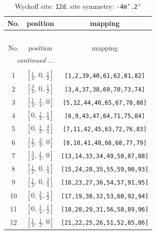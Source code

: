 \documentclass[fleqn,8pt]{jsarticle}
\begin{document}
\begin{longtable}{ccc}
\caption{Wyckoff site: {\tt 12d}, site symmetry: {\tt -4m'.2'}}
 \\
 \hline \hline
No. & position & mapping \\ \hline \endfirsthead

\multicolumn{2}{l}{\tablename\ \thetable{}} \\
 \hline \hline
No. & position & mapping \\ \hline \endhead

 \hline \hline
\multicolumn{2}{r}{\footnotesize\it continued ...} \\ \endfoot

 \hline \hline
\multicolumn{2}{r}{} \\ \endlastfoot

1 & $\left[ \frac{1}{4},\, 0,\, \frac{1}{2} \right]$ & {\tt [1,2,39,40,61,62,81,82]} \\ \hline
2 & $\left[ \frac{3}{4},\, 0,\, \frac{1}{2} \right]$ & {\tt [3,4,37,38,69,70,73,74]} \\ \hline
3 & $\left[ \frac{1}{2},\, \frac{1}{4},\, 0 \right]$ & {\tt [5,12,44,46,65,67,78,80]} \\ \hline
4 & $\left[ 0,\, \frac{1}{2},\, \frac{1}{4} \right]$ & {\tt [6,9,43,47,64,71,75,84]} \\ \hline
5 & $\left[ 0,\, \frac{1}{2},\, \frac{3}{4} \right]$ & {\tt [7,11,42,45,63,72,76,83]} \\ \hline
6 & $\left[ \frac{1}{2},\, \frac{3}{4},\, 0 \right]$ & {\tt [8,10,41,48,66,68,77,79]} \\ \hline
7 & $\left[ \frac{3}{4},\, \frac{1}{2},\, 0 \right]$ & {\tt [13,14,33,34,49,50,87,88]} \\ \hline
8 & $\left[ \frac{1}{2},\, 0,\, \frac{1}{4} \right]$ & {\tt [15,24,28,35,55,59,90,93]} \\ \hline
9 & $\left[ \frac{1}{2},\, 0,\, \frac{3}{4} \right]$ & {\tt [16,23,27,36,54,57,91,95]} \\ \hline
10 & $\left[ 0,\, \frac{3}{4},\, \frac{1}{2} \right]$ & {\tt [17,19,30,32,53,60,92,94]} \\ \hline
11 & $\left[ 0,\, \frac{1}{4},\, \frac{1}{2} \right]$ & {\tt [18,20,29,31,56,58,89,96]} \\ \hline
12 & $\left[ \frac{1}{4},\, \frac{1}{2},\, 0 \right]$ & {\tt [21,22,25,26,51,52,85,86]} \\
\end{longtable}
\renewcommand{\arraystretch}{1.2}
\end{document}
